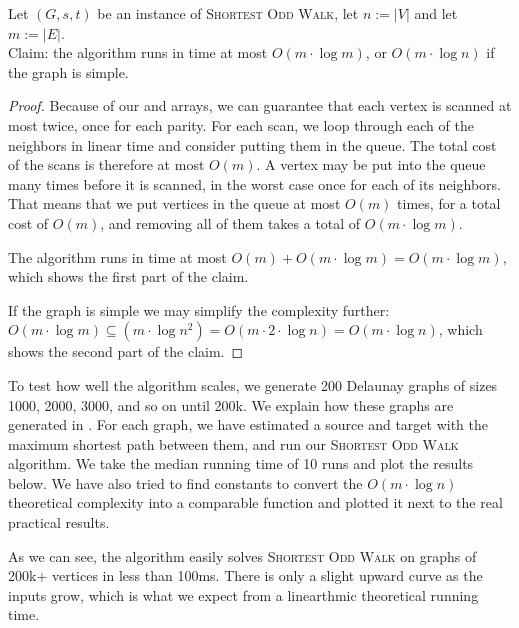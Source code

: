 \begin{theorem}
    Let $(G,s,t)$ be an instance of \textsc{Shortest Odd Walk}, let $n := |V|$ and let $m := |E|$.\\
    Claim: the algorithm runs in time at most $O(m \cdot \log m)$, or $O(m \cdot \log n)$ if the graph is simple.
    \begin{proof}
        Because of our  and  arrays, we can guarantee that each vertex is scanned at most twice, once for each parity. For each scan, we loop through each of the neighbors in linear time and consider putting them in the queue. The total cost of the scans is therefore at most $O(m)$. A vertex may be put into the queue many times before it is scanned, in the worst case once for each of its neighbors. That means that we put vertices in the queue at most $O(m)$ times, for a total cost of $O(m)$, and removing all of them takes a total of $O(m \cdot \log m)$. 
        
        The algorithm runs in time at most $O(m) + O(m \cdot \log m) = O(m \cdot \log m)$, which shows the first part of the claim.
        
        If the graph is simple we may simplify the complexity further: $O(m \cdot \log m) \subseteq (m \cdot \log n^2) = O(m \cdot 2 \cdot \log n) = O(m \cdot \log n)$, which shows the second part of the claim.
    \end{proof}
\end{theorem}

To test how well the algorithm scales, we generate 200 Delaunay graphs of sizes 1000, 2000, 3000, and so on until 200k. We explain how these graphs are generated in . For each graph, we have estimated a source and target with the maximum shortest path between them, and run our \textsc{Shortest Odd Walk} algorithm. We take the median running time of 10 runs and plot the results below. We have also tried to find constants to convert the $O(m \cdot \log n)$ theoretical complexity into a comparable function and plotted it next to the real practical results.

\begin{center}
        
\end{center}

As we can see, the algorithm easily solves \textsc{Shortest Odd Walk} on graphs of 200k+ vertices in less than 100ms. There is only a slight upward curve as the inputs grow, which is what we expect from a linearthmic theoretical running time.

